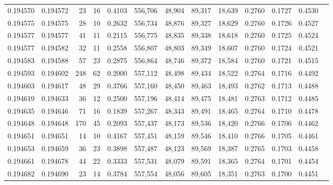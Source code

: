 \begin{tabular}{rrrrrrrrrrrrr}
0.194570 & 0.194572 &    23 &  16 &                                     0.4103 & 556,706 &  48,904 &  89,317 &  18,639 & 0.2760 & 0.1727 & 0.4530 \\
0.194575 & 0.194575 &    28 &  10 &                                     0.2632 & 556,734 &  48,876 &  89,327 &  18,629 & 0.2760 & 0.1726 & 0.4527 \\
0.194577 & 0.194577 &    41 &  11 &                                     0.2115 & 556,775 &  48,835 &  89,338 &  18,618 & 0.2760 & 0.1725 & 0.4524 \\
0.194577 & 0.194582 &    32 &  11 &                                     0.2558 & 556,807 &  48,803 &  89,349 &  18,607 & 0.2760 & 0.1724 & 0.4521 \\
0.194583 & 0.194588 &    57 &  23 &                                     0.2875 & 556,864 &  48,746 &  89,372 &  18,584 & 0.2760 & 0.1721 & 0.4515 \\
0.194593 & 0.194602 &   248 &  62 &                                     0.2000 & 557,112 &  48,498 &  89,434 &  18,522 & 0.2764 & 0.1716 & 0.4492 \\
0.194603 & 0.194617 &    48 &  29 &                                     0.3766 & 557,160 &  48,450 &  89,463 &  18,493 & 0.2762 & 0.1713 & 0.4488 \\
0.194619 & 0.194633 &    36 &  12 &                                     0.2500 & 557,196 &  48,414 &  89,475 &  18,481 & 0.2763 & 0.1712 & 0.4485 \\
0.194635 & 0.194646 &    71 &  16 &                                     0.1839 & 557,267 &  48,343 &  89,491 &  18,465 & 0.2764 & 0.1710 & 0.4478 \\
0.194648 & 0.194648 &   170 &  45 &                                     0.2093 & 557,437 &  48,173 &  89,536 &  18,420 & 0.2766 & 0.1706 & 0.4462 \\
0.194651 & 0.194651 &    14 &  10 &                                     0.4167 & 557,451 &  48,159 &  89,546 &  18,410 & 0.2766 & 0.1705 & 0.4461 \\
0.194653 & 0.194659 &    36 &  23 &                                     0.3898 & 557,487 &  48,123 &  89,569 &  18,387 & 0.2765 & 0.1703 & 0.4458 \\
0.194661 & 0.194678 &    44 &  22 &                                     0.3333 & 557,531 &  48,079 &  89,591 &  18,365 & 0.2764 & 0.1701 & 0.4454 \\
0.194682 & 0.194690 &    23 &  14 &                                     0.3784 & 557,554 &  48,056 &  89,605 &  18,351 & 0.2763 & 0.1700 & 0.4451 \\

\end{tabular}
